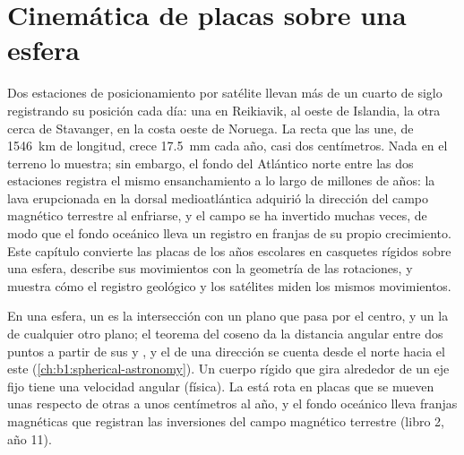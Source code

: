 \chapter{Cinemática de placas sobre una esfera}\label{ch:b1:plate-kinematics}

Dos estaciones de posicionamiento por satélite llevan más de un cuarto de siglo registrando su posición cada día: una en Reikiavik,
al oeste de Islandia, la otra cerca de Stavanger, en la costa oeste de Noruega. La recta que las une, de \qty{1546}{km} de longitud,
crece \qty{17.5}{mm} cada año, casi dos centímetros. Nada en el terreno lo muestra; sin embargo, el fondo del Atlántico norte entre
las dos estaciones registra el mismo ensanchamiento a lo largo de millones de años: la lava erupcionada en la dorsal medioatlántica
adquirió la dirección del campo magnético terrestre al enfriarse, y el campo se ha invertido muchas veces, de modo que el fondo
oceánico lleva un registro en franjas de su propio crecimiento. Este capítulo convierte las placas de los años escolares en casquetes
rígidos sobre una esfera, describe sus movimientos con la geometría de las rotaciones, y muestra cómo el registro geológico y los
satélites miden los mismos movimientos.

\begin{recall}
En una esfera, un  es la intersección con un plano que pasa por el centro, y un  la de cualquier otro
plano; el teorema del coseno da la distancia angular entre dos puntos a partir de sus  y , y el  de una
dirección se cuenta desde el norte hacia el este (\cref{ch:b1:spherical-astronomy}). Un cuerpo rígido que gira alrededor de un eje
fijo tiene una velocidad angular (física). La  está rota en placas que se mueven unas respecto de otras a unos centímetros
al año, y el fondo oceánico lleva franjas magnéticas que registran las inversiones del campo magnético terrestre (libro 2, año 11).
\end{recall}


